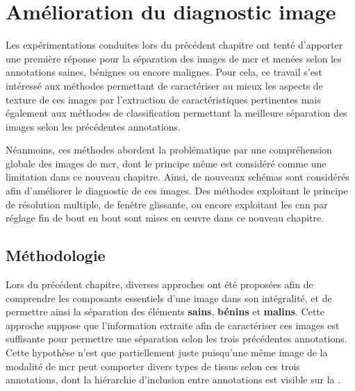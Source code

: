 \renewcommand{\thechapter}{\arabic{chapter}}
\setcounter{chapter}{5}

\chapter{Amélioration du diagnostic image}
\label{chap:chapter_6}
\chapterintro
Les expérimentations conduites lors du précédent chapitre ont tenté d'apporter une première réponse pour la séparation des images de \acrlong{mcr} et menées selon les annotations saines, bénignes ou encore malignes. Pour cela, ce travail s'est intéressé aux méthodes permettant de caractériser au mieux les aspects de texture de ces images par l'extraction de caractéristiques pertinentes mais également aux méthodes de classification permettant la meilleure séparation des images selon les précédentes annotations.\par

Néanmoins, ces méthodes abordent la problématique par une compréhension globale des images de \acrlong{mcr}, dont le principe même est considéré comme une limitation dans ce nouveau chapitre. Ainsi, de nouveaux schémas sont considérés afin d'améliorer le diagnostic de ces images. Des méthodes exploitant le principe de résolution multiple, de fenêtre glissante, ou encore exploitant les \acrlong{cnn} par réglage fin de bout en bout sont mises en œuvre dans ce nouveau chapitre.\par

\newpage

\section{Méthodologie}
Lors du précédent chapitre, diverses approches ont été proposées afin de comprendre les composants essentiels d'une image dans son intégralité, et de permettre ainsi la séparation des éléments \textbf{sains}, \textbf{bénins} et \textbf{malins}. Cette approche suppose que l'information extraite afin de caractériser ces images est suffisante pour permettre une séparation selon les trois précédentes annotations. Cette hypothèse n'est que partiellement juste puisqu'une même image de la modalité de \gls{mcr} peut comporter divers types de tissus selon ces trois annotations, dont la hiérarchie d'inclusion entre annotations est visible sur la .\par

